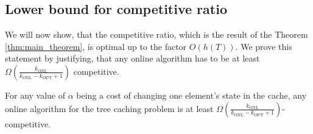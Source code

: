 \subsection{Lower bound for competitive ratio}
We will now show, that the
competitive ratio, which is the result of the Theorem \ref{thm:main_theorem}, is
optimal up to the factor $O(h(T))$. We prove this statement by justifying, that any
online algorithm has to be at least $\Omega
(\frac{k_{\mathrm{ONL}}}{k_{\mathrm{ONL}}- k_{\mathrm{OPT}} + 1})$ competitive.
\begin{theorem}
For any value of $\alpha$ being a cost of changing one element's
state in the cache, any online algorithm for the tree caching problem is at
least $\Omega (\frac{k_{\mathrm{ONL}}}{k_{\mathrm{ONL}}- k_{\mathrm{OPT}} +
1})$-competitive.
\end{theorem}
